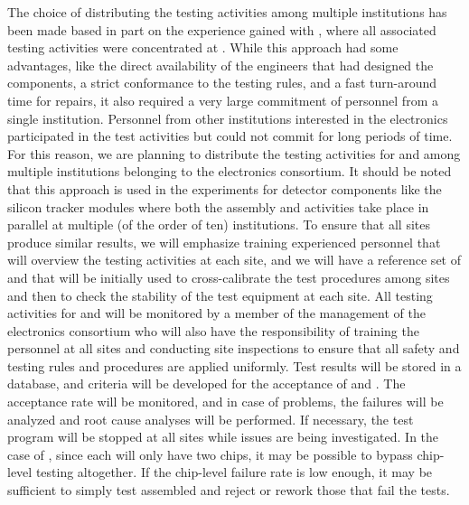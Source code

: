 The choice of distributing the testing activities among multiple
institutions has been made based in part on the experience gained
with , where all associated testing activities were concentrated
at . While this approach had some advantages, like the direct availability
of the engineers that had designed the components, a strict conformance
to the testing rules, and a fast turn-around
time for repairs, it also required a very large commitment of
personnel from a single institution. Personnel from other institutions
interested in the  electronics participated in the test
activities but could not commit for long periods of time. For
this reason, we are planning to distribute the  testing
activities for  and  among multiple
institutions belonging to the  electronics consortium.
It should be noted that this approach is used in the 
experiments for detector components like the silicon tracker 
modules where both the assembly and  activities take
place in parallel at multiple (of the order of ten) institutions.
To ensure that all sites produce similar
results, we will emphasize training experienced personnel
that will overview the testing activities at each site,
and we will have a reference set of  and 
that will be initially used to cross-calibrate the
test procedures among sites and then to check the
stability of the test equipment at each site. 
All testing activities for  and 
will be monitored by a member of the management of the 
electronics consortium who will also have the responsibility of training the
personnel at all sites and conducting site
inspections to ensure that all safety and testing rules
and procedures are applied uniformly. Test results will
be stored in a database, and criteria will be developed
for the acceptance of  and . The acceptance rate
will be monitored, and in case of problems,
the failures will be analyzed and root cause analyses
will be performed. If necessary, the test program will be stopped
at all sites while issues are being investigated. In the case of ,
since each  will only have two chips, it may be possible to bypass
chip-level testing altogether. If the chip-level failure rate is low enough,
it may be sufficient to simply test assembled  and reject or rework
those that fail the tests.

